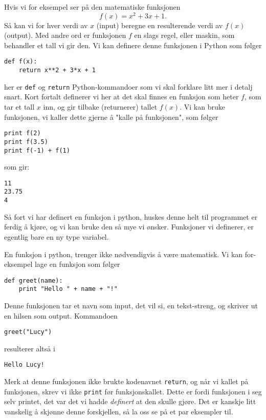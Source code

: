 \documentclass[a4paper, 11pt, notitlepage]{article}
\begin{document}
Hvis vi for eksempel ser på den matematiske funksjonen
$$f(x) = x^2 + 3x + 1.$$
Så kan vi for hver verdi av $x$ (input) beregne en resulterende verdi av $f(x)$ (output). Med andre ord er funksjonen $f$ en slags regel, eller maskin, som behandler et tall vi gir den. Vi kan definere denne funksjonen i Python som følger
\begin{lstlisting}
def f(x):
    return x**2 + 3*x + 1    
\end{lstlisting}
\vspace{-0.3cm}
her er \verb+def+ og \verb+return+ Python-kommandoer som vi skal forklare litt mer i detalj snart. Kort fortalt definerer vi her at det skal finnes en funksjon som heter $f$, som tar et tall $x$ inn, og gir tilbake (returnerer) tallet $f(x)$. Vi kan bruke funksjonen, vi kaller dette gjerne å "kalle på funksjonen", som følger
\begin{lstlisting}
print f(2)
print f(3.5)
print f(-1) + f(1)
\end{lstlisting}
\vspace{-0.3cm}
som gir:
\begin{lstlisting}
11
23.75
4
\end{lstlisting}
\vspace{-0.3cm}
Så fort vi har definert en funksjon i python, huskes denne helt til programmet er ferdig å kjøre, og vi kan bruke den så mye vi ønsker. Funksjoner vi definerer, er egentlig bare en ny type variabel.

En funksjon i python, trenger ikke nødvendigvis å være matematisk. Vi kan for-eksempel lage en funksjon som følger
\begin{lstlisting}
def greet(name):
    print "Hello " + name + "!"
\end{lstlisting}
\vspace{-0.3cm}
Denne funksjonen tar et navn som input, det vil si, en tekst-streng, og skriver ut en hilsen som output. Kommandoen
\begin{lstlisting}
greet("Lucy")
\end{lstlisting}
\vspace{-0.3cm}
resulterer altså i
\begin{lstlisting}
Hello Lucy!
\end{lstlisting}
\vspace{-0.3cm}
Merk at denne funksjonen ikke brukte kodenavnet \verb+return+, og når vi kallet på funksjonen, skrev vi ikke \verb+print+ før funksjonskallet. Dette er fordi funksjonen i seg selv printet, det var det vi hadde \emph{definert} at den skulle gjøre. Det er kanskje litt vanskelig å skjønne denne forskjellen, så la oss se på et par eksempler til.
\end{document}
